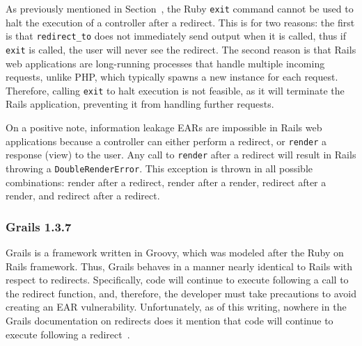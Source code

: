 As previously mentioned in Section~, the Ruby \texttt{exit}
command cannot be used to halt the execution of a controller after a
redirect. This is for two reasons: the first is that \texttt{redirect\_to}
does not immediately send output when it is called, thus if \texttt{exit}
is called, the user will never see the redirect. The second reason is that
Rails web applications are long-running processes that handle multiple
incoming requests, unlike PHP, which typically spawns a new instance for
each request. Therefore, calling \texttt{exit} to halt execution is not
feasible, as it will terminate the Rails application, preventing it from
handling further requests.


On a positive note, information leakage EARs are impossible in Rails web
applications because a controller can either perform a redirect, or
\texttt{render} a response (view) to the user. Any call to \texttt{render}
after a redirect will result in Rails throwing a
\texttt{DoubleRenderError}. This exception is thrown in all possible
combinations: render after a redirect, render after a render, redirect
after a render, and redirect after a redirect.

\subsubsection{Grails 1.3.7}
Grails is a framework written in Groovy, which was modeled after the Ruby on
Rails framework. Thus, Grails behaves in a manner nearly identical to Rails with
respect to redirects. Specifically, code will continue to execute following a
call to the redirect function, and, therefore, the developer must take
precautions to avoid creating an EAR vulnerability. Unfortunately, as of this
writing, nowhere in the Grails documentation on redirects does it mention that
code will continue to execute following a redirect~\cite{grails-redirects}.

